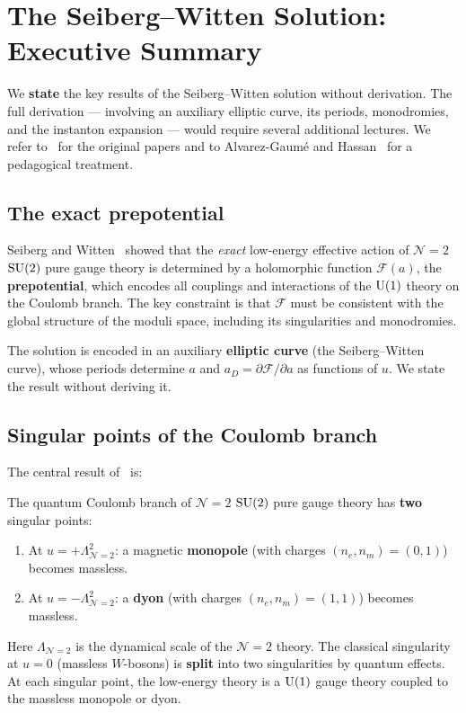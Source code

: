 \documentclass[11pt,a4paper]{article}
\begin{document}
\section{The Seiberg--Witten Solution: Executive Summary}
\label{sec:SW}

\begin{warningbox}[title={Scope of this section}]
  We \textbf{state} the key results of the Seiberg--Witten solution
  without derivation.  The full derivation --- involving an auxiliary
  elliptic curve, its periods, monodromies, and the instanton expansion
  --- would require several additional lectures.  We refer
  to~\cite{SW1994,SW1994b} for the original papers
  and to Alvarez-Gaum\'e and Hassan~\cite{AGH1997} for a pedagogical
  treatment.
\end{warningbox}

\subsection{The exact prepotential}

Seiberg and Witten~\cite{SW1994} showed that the \emph{exact} low-energy
effective action of $\mathcal{N}=2$ $\SU{2}$ pure gauge theory is
determined by a holomorphic function $\mathcal{F}(a)$, the
\textbf{prepotential}, which encodes all couplings and interactions
of the $\mathrm{U}(1)$ theory on the Coulomb branch.  The key constraint is
that $\mathcal{F}$ must be consistent with the global structure of the
moduli space, including its singularities and monodromies.

The solution is encoded in an auxiliary \textbf{elliptic curve} (the
Seiberg--Witten curve), whose periods determine $a$ and $a_D = \partial
\mathcal{F}/\partial a$ as functions of $u$.  We state the result without
deriving it.

\subsection{Singular points of the Coulomb branch}

The central result of~\cite{SW1994} is:

\begin{tcolorbox}[
  enhanced,
  colback=blue!5!white,
  colframe=blue!70!black,
  fonttitle=\bfseries\large,
  title={Seiberg--Witten Solution for $\SU{2}$},
  breakable
]
The quantum Coulomb branch of $\mathcal{N}=2$ $\SU{2}$ pure gauge theory
has \textbf{two} singular points:
\begin{enumerate}
  \item At $u = +\Lambda_{\mathcal{N}=2}^2$: a magnetic \textbf{monopole}
    (with charges $(n_e, n_m) = (0, 1)$) becomes massless.
  \item At $u = -\Lambda_{\mathcal{N}=2}^2$: a \textbf{dyon}
    (with charges $(n_e, n_m) = (1, 1)$) becomes massless.
\end{enumerate}
Here $\Lambda_{\mathcal{N}=2}$ is the dynamical scale of the
$\mathcal{N}=2$ theory.  The classical singularity at $u = 0$ (massless
$W$-bosons) is \textbf{split} into two singularities by quantum effects.
At each singular point, the low-energy theory is a $\mathrm{U}(1)$ gauge theory
coupled to the massless monopole or dyon.
\end{tcolorbox}
\end{document}
